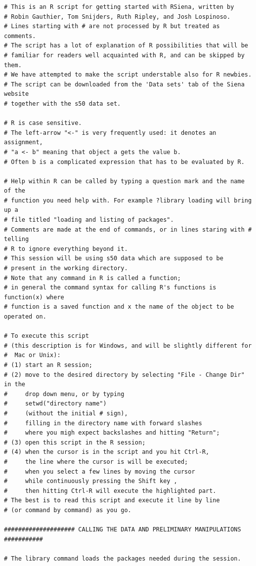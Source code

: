 \documentclass[a4paper,fleqn]{article}
\newcommand{\+}{\, + \,}
\begin{document}
{\begin{verbatim}
# This is an R script for getting started with RSiena, written by
# Robin Gauthier, Tom Snijders, Ruth Ripley, and Josh Lospinoso.
# Lines starting with # are not processed by R but treated as comments.
# The script has a lot of explanation of R possibilities that will be
# familiar for readers well acquainted with R, and can be skipped by them.
# We have attempted to make the script understable also for R newbies.
# The script can be downloaded from the 'Data sets' tab of the Siena website
# together with the s50 data set.

# R is case sensitive.
# The left-arrow "<-" is very frequently used: it denotes an assignment,
# "a <- b" meaning that object a gets the value b.
# Often b is a complicated expression that has to be evaluated by R.

# Help within R can be called by typing a question mark and the name of the
# function you need help with. For example ?library loading will bring up a
# file titled "loading and listing of packages".
# Comments are made at the end of commands, or in lines staring with # telling
# R to ignore everything beyond it.
# This session will be using s50 data which are supposed to be
# present in the working directory.
# Note that any command in R is called a function;
# in general the command syntax for calling R's functions is function(x) where
# function is a saved function and x the name of the object to be operated on.

# To execute this script
# (this description is for Windows, and will be slightly different for
#  Mac or Unix):
# (1) start an R session;
# (2) move to the desired directory by selecting "File - Change Dir" in the
#     drop down menu, or by typing
#     setwd("directory name")
#     (without the initial # sign),
#     filling in the directory name with forward slashes
#     where you migh expect backslashes and hitting "Return";
# (3) open this script in the R session;
# (4) when the cursor is in the script and you hit Ctrl-R,
#     the line where the cursor is will be executed;
#     when you select a few lines by moving the cursor
#     while continuously pressing the Shift key ,
#     then hitting Ctrl-R will execute the highlighted part.
# The best is to read this script and execute it line by line
# (or command by command) as you go.

#################### CALLING THE DATA AND PRELIMINARY MANIPULATIONS ###########

# The library command loads the packages needed during the session.


\end{verbatim}}
\end{document}
